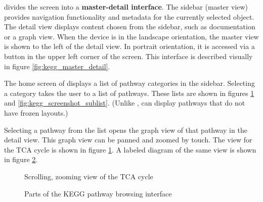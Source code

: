 \keggapp divides the screen into a \textbf{master-detail interface}. The
sidebar (master view) provides navigation functionality and metadata for the
currently selected object. The detail view displays content chosen from the
sidebar, such as documentation or a graph view. When the device is in the
landscape orientation, the master view is shown to the left of the detail view.
In portrait orientation, it is accessed via a button in the upper left corner of
the screen. This interface is described visually in figure
\ref{fig:kegg_master_detail}.

The home screen of \keggapp displays a list of pathway categories in the
sidebar. Selecting a category takes the user to a list of pathways. These lists
are shown in figures \ref{fig:kegg_screenshot_pathway} and
\ref{fig:kegg_screenshot_sublist}.  (Unlike \mawapp, \keggapp can
display pathways that do not have frozen layouts.)

Selecting a pathway from the list opens the graph view of that pathway in the
detail view. This graph view can be panned and zoomed by touch. The view for
the TCA cycle is shown in figure \ref{fig:kegg_screenshot_pathway}. A labeled
diagram of the same view is shown in figure \ref{fig:kegg_pathway_diagram}.

\begin{figure}[hbt]
    \caption{\label{fig:kegg_screenshot_pathway} Scrolling, zooming view of
    the TCA cycle}
\end{figure}

\begin{figure}[hbt]
    \caption{\label{fig:kegg_pathway_diagram} Parts of the KEGG pathway browsing
    interface}
\end{figure}

